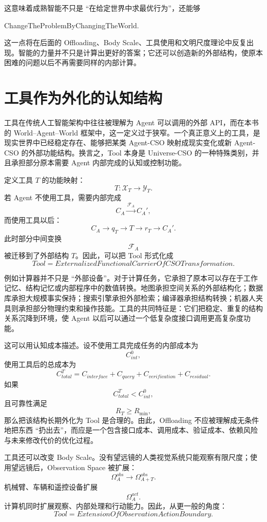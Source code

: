 这意味着成熟智能不只是 ``在给定世界中求最优行为''，还能够
\begin{statementbox}
ChangeTheProblemByChangingTheWorld.
\end{statementbox}
这一点将在后面的 Offloading、Body Scale、工具使用和文明尺度理论中反复出现。智能的力量并不只是计算出更好的答案；它还可以创造新的外部结构，使原本困难的问题以后不再需要同样的内部计算。


\section{工具作为外化的认知结构}

工具在传统人工智能架构中往往被理解为 Agent 可以调用的外部 API，而在本书的 World--Agent--World 框架中，这一定义过于狭窄。一个真正意义上的工具，是现实世界中已经稳定存在、能够把某类 Agent-CSO 映射成现实变化或新 Agent-CSO 的外部功能结构。换言之，Tool 本身是 Universe-CSO 的一种特殊类别，并且承担部分原本需要 Agent 内部完成的认知或控制功能。

定义工具 $T$ 的功能映射：
\[
T:
\mathcal X_T
\rightarrow
\mathcal Y_T.
\]
若 Agent 不使用工具，需要内部完成
\[
C_A
\xrightarrow{\mathcal F_A}
C_A',
\]
而使用工具以后：
\[
C_A
\rightarrow
q_T
\rightarrow
T
\rightarrow
r_T
\rightarrow
C_A'.
\]
此时部分中间变换
\[
\mathcal F_A
\]
被迁移到了外部结构 $T$。因此，可以把 Tool 形式化成
\[
\boxed{
Tool
=
ExternalizedFunctionalCarrierOfCSOTransformation.
}
\]

例如计算器并不只是 ``外部设备''。对于计算任务，它承担了原本可以存在于工作记忆、结构记忆或内部程序中的数值转换。地图承担空间关系的外部结构化；数据库承担大规模事实保持；搜索引擎承担外部检索；编译器承担结构转换；机器人夹具则承担部分物理约束和操作技能。工具的共同特征是：它们把稳定、重复的结构关系沉降到环境，使 Agent 以后可以通过一个低复杂度接口调用更高复杂度功能。

这可以用认知成本描述。设不使用工具完成任务的内部成本为
\[
C_{int}^{0},
\]
使用工具后的总成本为
\[
C_{total}^{T}
=
C_{interface}
+
C_{query}
+
C_{verification}
+
C_{residual}.
\]
如果
\[
C_{total}^{T}
<
C_{int}^{0},
\]
且可靠性满足
\[
R_T
\geq
R_{\min},
\]
那么把该结构长期外化为 Tool 是合理的。由此，Offloading 不应被理解成无条件地把东西 ``扔出去''，而应是一个包含接口成本、调用成本、验证成本、依赖风险与未来修改代价的优化过程。

工具还可以改变 Body Scale。没有望远镜的人类视觉系统只能观察有限尺度；使用望远镜后，Observation Space 被扩展：
\[
\Omega_A^{obs}
\rightarrow
\Omega_{A+T}^{obs}.
\]
机械臂、车辆和遥控设备扩展
\[
\Omega_A^{act}.
\]
计算机同时扩展观察、内部处理和行动能力。因此，从更一般的角度：
\[
\boxed{
Tool
=
ExtensionOfObservationActionBoundary.
}
\]

